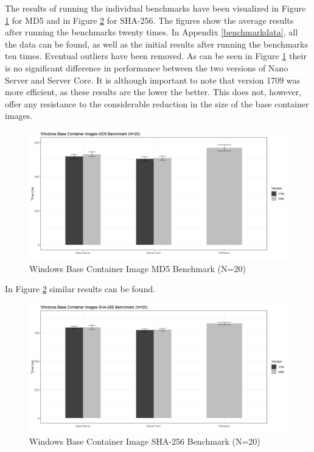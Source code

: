 The results of running the individual benchmarks have been visualized in Figure \ref{fig:MD5} for MD5 and in Figure \ref{fig:SHA} for SHA-256. The figures show the average results after running the benchmarks twenty times. In Appendix \ref{benchmarkdata}, all the data can be found, as well as the initial results after running the benchmarks ten times. Eventual outliers have been removed. 
As can be seen in Figure \ref{fig:MD5} their is no significant difference in performance between the two versions of Nano Server and Server Core. It is although important to note that version 1709 was more efficient, as these results are the lower the better. This does not, however, offer any resistance to the considerable reduction in the size of the base container images. 

\begin{figure}[h]
	\captionsetup{width=0.8\linewidth}
	\includegraphics[width=0.9\linewidth]{img/MD5_20.png}
	\centering
	\caption{Windows Base Container Image MD5 Benchmark (N=20)}
	\label{fig:MD5}
\end{figure}

In Figure \ref{fig:SHA} similar results can be found. 

\begin{figure}[h]
	\captionsetup{width=0.8\linewidth}
	\includegraphics[width=0.9\linewidth]{img/SHA_20.png}
	\centering
	\caption{Windows Base Container Image SHA-256 Benchmark (N=20)}
	\label{fig:SHA}
\end{figure}

